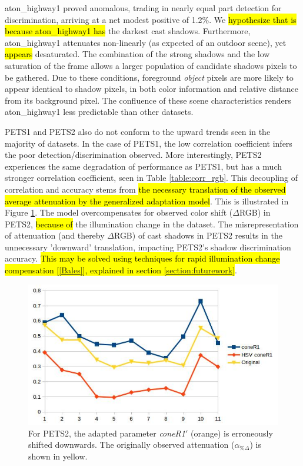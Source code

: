 aton\_highway1 proved anomalous, trading in nearly equal part detection for discrimination, arriving at a net modest positive of 1.2\%. We \hl{hypothesize that is because aton\_highway1 has} the darkest cast shadows. Furthermore, aton\_highway1 attenuates non-linearly (as expected of an outdoor scene), yet \hl{appears} desaturated. The combination of the strong shadows and the low saturation of the frame allows a larger population of candidate shadows pixels to be gathered. Due to these conditions, foreground \textit{object} pixels are more likely to appear identical to shadow pixels, in both color information and relative distance from its background pixel. The confluence of these scene characteristics renders aton\_highway1 less predictable than other datasets.

PETS1 and PETS2 also do not conform to the upward trends seen in the majority of datasets. In the case of PETS1, the low correlation coefficient infers the poor detection/discrimination observed. More interestingly, PETS2 experiences the same degradation of performance as PETS1, but has a much stronger correlation coefficient, seen in Table \ref{table:corr_rgb}. This decoupling of correlation and accuracy stems from \hl{the necessary translation of the observed average attenuation by the generalized adaptation model}. This is illustrated in Figure \ref{fig:pets2_translate}. The model overcompensates for observed color shift ($\Delta$RGB) in PETS2, \hl{because of} the illumination change in the dataset. The misrepresentation of attenuation (and thereby $\Delta$RGB) of cast shadows in PETS2 results in the unnecessary 'downward' translation, impacting PETS2's shadow discrimination accuracy. \hl{This may be solved using techniques for rapid illumination change compensation [\ref{Bales}], explained in section \ref{section:futurework}}.

\begin{figure}
  \centering
  \includegraphics[width=1\linewidth]{figures/model/pets2_translate.jpg}
\caption{For PETS2, the adapted parameter \textit{coneR1}$'$ (orange) is erroneously shifted downwards. The originally observed attenuation ($\alpha_{\%\Delta}$) is shown in yellow.}
\label{fig:pets2_translate}
\end{figure} 

